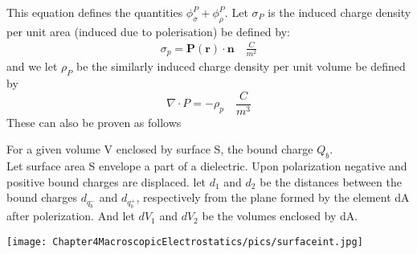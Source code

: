 This equation defines the quantities $\phi^P_\sigma + \phi^P_\rho$. Let $\sigma_P$ is the induced charge density per unit area (induced due to polerisation) be defined by:
\begin{eqnarray}
    \sigma_p = \textbf{P}(\textbf{r})\cdot \textbf{n}  \quad \frac{C}{m^2}
\end{eqnarray}
and we let $\rho_P$ be the similarly induced charge density per unit volume be defined by 
\begin{equation}
    \nabla \cdot P = -\rho_p \quad \frac{C}{m^3}
\end{equation}
These can also be proven as follows

\begin{tcolorbox}[every float=\centering, title=Gauss's law for the field of P]
    \begin{minipage}[t]{0.5\linewidth}
    \vspace*{0pt}
    For a given volume V enclosed by surface S, the bound charge $Q_b$.\\
    \noindent
    Let surface area S envelope a part of a dielectric. Upon polarization negative and positive bound charges are displaced. let $d_1$ and $d_2$ be the distances between the bound charges $d_{q^-_b}$ and $d_{q^+_b}$,
    respectively from the plane formed by the element dA after polerization. And let $dV_1$ and $dV_2$ be the volumes enclosed by dA.

    \end{minipage}\hfill%
    \begin{minipage}[t]{0.4\linewidth}
    \vspace*{0pt}
        \texttt{[image: Chapter4MacroscopicElectrostatics/pics/surfaceint.jpg]}
    \end{minipage}
\end{tcolorbox}
